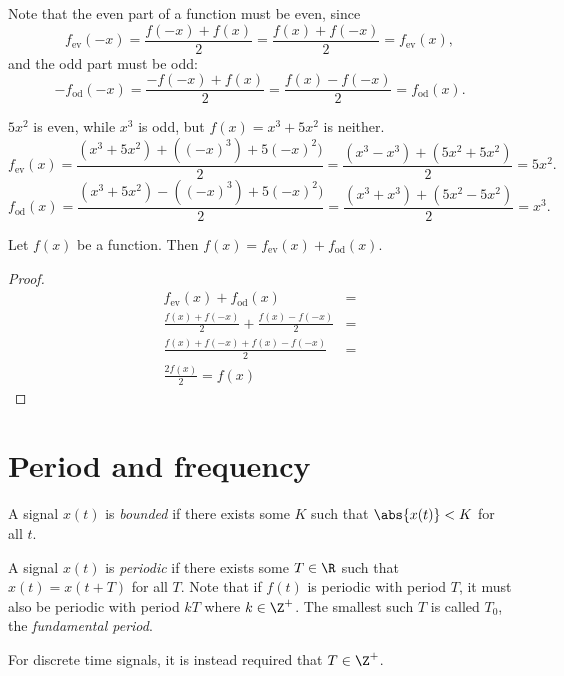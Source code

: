 \documentclass[12pt]{article}
\begin{document}
Note that the even part of a function must be even, since \[f_{\mathrm{ev}}(-x) = \frac{f(-x) + f(x)}{2} = \frac{f(x) + f(-x)}{2} = f_{\mathrm{ev}}(x),\] and the odd part must be odd: \[-f_{\mathrm{od}}(-x) = \frac{-f(-x)+f(x)}{2} = \frac{f(x) - f(-x)}{2} = f_{\mathrm{od}}(x).\]

\begin{exmp}
    $5x^2$ is even, while $x^3$ is odd, but $f(x) = x^3 + 5x^2$ is neither. \[f_{\mathrm{ev}}(x) = \frac{(x^3 + 5x^2) + ((-x)^3) + 5(-x)^2)}{2} = \frac{(x^3 - x^3) + (5x^2 + 5x^2)}{2} = 5x^2.\]
    \[f_{\mathrm{od}}(x) = \frac{(x^3 + 5x^2) - ((-x)^3) + 5(-x)^2)}{2} = \frac{(x^3 + x^3) + (5x^2 - 5x^2)}{2} = x^3.\]
\end{exmp}

\begin{prop}
    Let $f(x)$ be a function. Then $f(x) = f_{\mathrm{ev}}(x) + f_{\mathrm{od}}(x)$.
\end{prop}

\begin{proof}
    \begin{align*}
        f_{\mathrm{ev}}(x) + f_{\mathrm{od}}(x) &= \\
        \frac{f(x) + f(-x)}{2} + \frac{f(x) - f(-x)}{2} &= \\
        \frac{f(x) + f(-x) + f(x) - f(-x)}{2} &= \\
        \frac{2f(x)}{2} = f(x)
    \end{align*}
\end{proof}

\section{Period and frequency}

\begin{defn}
    A signal $x(t)$ is \emph{bounded} if there exists some $K$ such that $\abs{x(t)} < K$ for all $t$.
\end{defn}

\begin{defn}
    A signal $x(t)$ is \emph{periodic} if there exists some $T \in \R$ such that $x(t) = x(t + T)$ for all $T$. Note that if $f(t)$ is periodic with period $T$, it must also be periodic with period $kT$ where $k \in \Z^+$. The smallest such $T$ is called $T_0$, the \emph{fundamental period}.
\end{defn}

\begin{rmk}
    For discrete time signals, it is instead required that $T \in \Z^+$.
\end{rmk}
\end{document}
